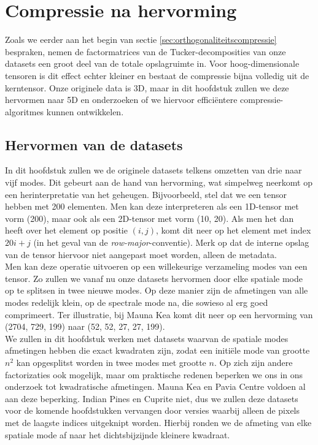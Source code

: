 \chapter{Compressie na hervorming}
\label{hoofdstuk:hervorming}

Zoals we eerder aan het begin van sectie \ref{sec:orthogonaliteitscompressie} bespraken, nemen de factormatrices van de Tucker-decomposities van onze datasets een groot deel van de totale opslagruimte in. Voor hoog-dimensionale tensoren is dit effect echter kleiner en bestaat de compressie bijna volledig uit de kerntensor. Onze originele data is 3D, maar in dit hoofdstuk zullen we deze hervormen naar 5D en onderzoeken of we hiervoor effici\"entere compressie-algoritmes kunnen ontwikkelen.

\section{Hervormen van de datasets}

In dit hoofdstuk zullen we de originele datasets telkens omzetten van drie naar vijf modes. Dit gebeurt aan de hand van hervorming, wat simpelweg neerkomt op een herinterpretatie van het geheugen. Bijvoorbeeld, stel dat we een tensor hebben met 200 elementen. Men kan deze interpreteren als een 1D-tensor met vorm (200), maar ook als een 2D-tensor met vorm (10, 20). Als men het dan heeft over het element op positie $(i, j)$, komt dit neer op het element met index $20i + j$ (in het geval van de \textit{row-major}-conventie). Merk op dat de interne opslag van de tensor hiervoor niet aangepast moet worden, alleen de metadata.\\

Men kan deze operatie uitvoeren op een willekeurige verzameling modes van een tensor. Zo zullen we vanaf nu onze datasets hervormen door elke spatiale mode op te splitsen in twee nieuwe modes. Op deze manier zijn de afmetingen van alle modes redelijk klein, op de spectrale mode na, die sowieso al erg goed comprimeert. Ter illustratie, bij Mauna Kea komt dit neer op een hervorming van (2704, 729, 199) naar (52, 52, 27, 27, 199).\\

We zullen in dit hoofdstuk werken met datasets waarvan de spatiale modes afmetingen hebben die exact kwadraten zijn, zodat een initi\"ele mode van grootte $n^2$ kan opgesplitst worden in twee modes met grootte $n$. Op zich zijn andere factorizaties ook mogelijk, maar om praktische redenen beperken we ons in ons onderzoek tot kwadratische afmetingen. Mauna Kea en Pavia Centre voldoen al aan deze beperking. Indian Pines en Cuprite niet, dus we zullen deze datasets voor de komende hoofdstukken vervangen door versies waarbij alleen de pixels met de laagste indices uitgeknipt worden. Hierbij ronden we de afmeting van elke spatiale mode af naar het dichtsbijzijnde kleinere kwadraat.

